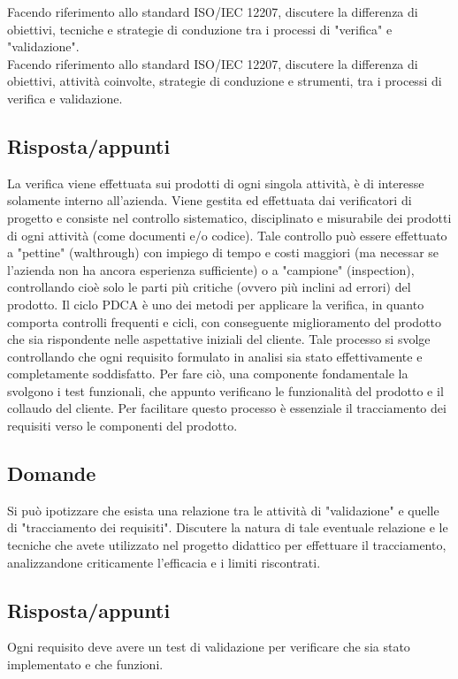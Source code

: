 Facendo riferimento allo standard ISO/IEC 12207, discutere la differenza di obiettivi, tecniche e strategie di conduzione tra i processi di "verifica" e "validazione".\\

Facendo riferimento allo standard ISO/IEC 12207, discutere la differenza di obiettivi, attività coinvolte, strategie di conduzione e strumenti, tra i processi di verifica e validazione.

\subsection*{Risposta/appunti}
La verifica viene effettuata sui prodotti di ogni singola attività, è di interesse solamente interno all'azienda. Viene gestita
ed effettuata dai verificatori di progetto e consiste nel controllo sistematico, disciplinato e misurabile dei prodotti di
ogni attività (come documenti e/o codice). Tale controllo può essere effettuato a "pettine" (walthrough) con impiego di
tempo e costi maggiori (ma necessar se l'azienda non ha ancora esperienza sufficiente) o a "campione" (inspection),
controllando cioè solo le parti più critiche (ovvero più inclini ad errori) del prodotto.
Il ciclo PDCA è uno dei metodi per applicare la verifica, in quanto comporta controlli frequenti e cicli, con conseguente
miglioramento del prodotto che sia rispondente nelle aspettative iniziali del cliente. Tale processo si svolge controllando
che ogni requisito formulato in analisi sia stato effettivamente e completamente soddisfatto. Per fare ciò, una
componente fondamentale la svolgono i test funzionali, che appunto verificano le funzionalità del prodotto e il collaudo
del cliente. Per facilitare questo processo è essenziale il tracciamento dei requisiti verso le componenti del prodotto. 

\subsection*{Domande}
Si può ipotizzare che esista una relazione tra le attività di "validazione" e quelle di "tracciamento dei requisiti". Discutere la natura di tale eventuale relazione e le tecniche che avete utilizzato nel progetto didattico per effettuare il tracciamento, analizzandone criticamente l'efficacia e i limiti riscontrati.

\subsection*{Risposta/appunti}
Ogni requisito deve avere un test di validazione per verificare che sia stato implementato e che funzioni.

